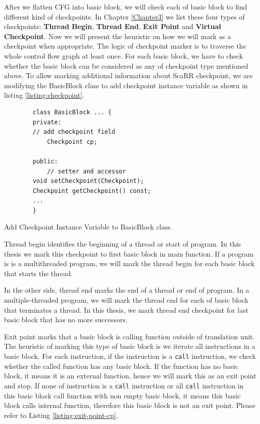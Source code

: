 After we flatten CFG into basic block, we will check each of basic block to find
different kind of checkpoints. In Chapter \ref{Chapter3} we list these four
types of checkpoints: \textbf{Thread Begin}, \textbf{Thread End}, \textbf{Exit
Point} and \textbf{Virtual Checkpoint}. Now we will present the heuristic on how
we will mark as a checkpoint when appropriate.  The logic of checkpoint marker
is to traverse the whole control flow graph at least once. For each basic block,
we have to check whether the basic block can be considered as any of checkpoint
type mentioned above. To allow marking additional information about ScaRR
checkpoint, we are modifying the BasicBlock class to add checkpoint instance
variable as shown in listing \ref{listing:checkpoint}.

\begin{listing}[htbp]
    \begin{verbatim}
        class BasicBlock ... {
        private:
        // add checkpoint field
            Checkpoint cp;

        public:
            // setter and accessor
        void setCheckpoint(Checkpoint);
        Checkpoint getCheckpoint() const;
        ...
        }
    \end{verbatim}
    \caption{Add Checkpoint Instance Variable to BasicBlock class.}    
    \label{listing:checkpoint}
\end{listing}

Thread begin identifies the beginning of a thread or start of program. In this
thesis we mark this checkpoint to first basic block in main function. If a
program is is a multithreaded program, we will mark the thread begin for each
basic block that starts the thread.

In the other side, thread end marks the end of a thread or end of program. In a
multiple-threaded program, we will mark the thread end for each of basic block
that terminates a thread. In this thesis, we mark thread end checkpoint for last
basic block that has no more successors.

Exit point marks that a basic block is calling function outside of translation
unit. The heuristic of marking this type of basic block is we iterate all
instructions in a basic block. For each instruction, if the instruction is a
\texttt{call} instruction, we check whether the called function has any basic
block. If the function has no basic block, it means it is an external function,
hence we will mark this as an exit point and stop. If none of instruction is a
\texttt{call} instruction or all \texttt{call} instruction in this basic block
call function with non empty basic block, it means this basic block calls
internal function, therefore this basic block is not an exit point. Please refer
to Listing \ref{listing:exit-point-cp}.

